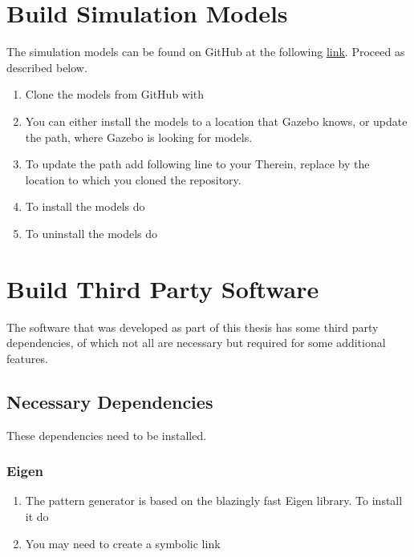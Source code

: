 \section{Build Simulation Models}
\label{sec::A4_sm}
The simulation models can be found on GitHub at the following \href{https://github.com/mhubii/gazebo_models/}{\underline{link}}. Proceed as described below.
\begin{enumerate}
	\item Clone the models from GitHub with
	\newline {}
	\item You can either install the models to a location that Gazebo knows, or update the path, where Gazebo is looking for models.
	\item To update the path add following line to your 
	\newline {}
	\newline Therein, replace \inlinecode{}{<>} by the location to which you cloned the repository.
	\item To install the models do
	\newline {}
	\newline {}
	\newline {}
	\item To uninstall the models do
	\newline {}
	\newline {}
\end{enumerate}
\FloatBarrier
\section{Build Third Party Software}
\label{sec::A5_tp}
The software that was developed as part of this thesis has some third party dependencies, of which not all are necessary but required for some additional features.
\FloatBarrier
\subsection{Necessary Dependencies}
\label{sec::A51_nd}
These dependencies need to be installed.
\FloatBarrier
\subsubsection{Eigen}
\begin{enumerate}
	\item The pattern generator is based on the blazingly fast Eigen library. To install it do
	\newline {}
	\item You may need to create a symbolic link
	\newline {}
	\newline {}
\end{enumerate}
\FloatBarrier
